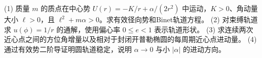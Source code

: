 (1) 质量 \(m\) 的质点在中心势 \(U(r)=-K/r+\alpha/(2r^2)\) 中运动，\(K>0\)、角动量大小 \(\ell>0\)，且 \(\ell^2+m\alpha>0\)。求有效径向势和Binet轨道方程。
(2) 对束缚轨道求 \(u(\phi)=1/r\) 的通解，使用偏心率 \(0\le e<1\) 表示轨道形状。
(3) 求连续两次近心点之间的方位角增量以及相对于封闭开普勒椭圆的每周期近心点进动量。
(4) 通过有效势二阶导证明圆轨道稳定，说明 \(\alpha\to0\) 与小 \(|\alpha|\) 的进动方向。
